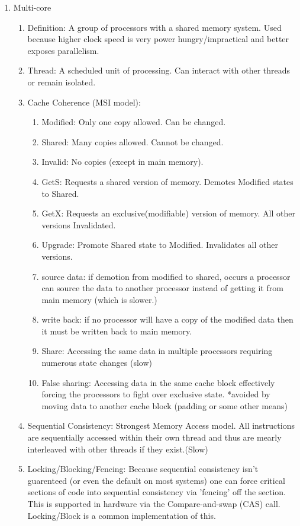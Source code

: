 \documentclass[12pt]{article}
\renewcommand{\=}[1]{\stackrel{#1}{=}} %
\theoremstyle{definition}
\theoremstyle{remark}
\begin{document}
  \begin{enumerate}
  \item Multi-core
    \begin{enumerate}
    \item Definition: A group of processors with a shared memory
      system. Used because higher clock speed is very power
      hungry/impractical and better exposes parallelism. 
    \item Thread: A scheduled unit of processing. Can interact with
      other threads or remain isolated.
    \item Cache Coherence (MSI model):
      \begin{enumerate}
      \item Modified: Only one copy allowed. Can be changed.
      \item Shared: Many copies allowed. Cannot be changed.
      \item Invalid: No copies (except in main memory).
      \item GetS: Requests a shared version of memory. Demotes
        Modified states to Shared.
      \item GetX: Requests an exclusive(modifiable) version of
        memory. All other versions Invalidated.
      \item Upgrade: Promote Shared state to Modified. Invalidates all
        other versions.
      \item source data: if demotion from modified to shared, occurs a
        processor can source the data to another processor instead of
        getting it from main memory (which is slower.)
      \item write back: if no processor will have a copy of the
        modified data then it must be written back to main memory.
      \item Share: Accessing the same data in multiple processors
        requiring numerous state changes (slow)
      \item False sharing: Accessing data in the same cache block
        effectively forcing the processors to fight over exclusive
        state. *avoided by moving data to another cache block (padding
        or some other means)
      \end{enumerate}

    \item Sequential Consistency: Strongest Memory Access model. All
      instructions are sequentially accessed within their own thread
      and thus are mearly interleaved with other threads if they exist.(Slow)
    \item Locking/Blocking/Fencing: Because sequential consistency
      isn't guarenteed (or even the default on most systems) one can
      force critical sections of code into sequential consistency via
      'fencing' off the section. This is supported in hardware via the
      Compare-and-swap (CAS) call. Locking/Block is a common
      implementation of this.
    \end{enumerate}


\end{enumerate}
\end{document}
